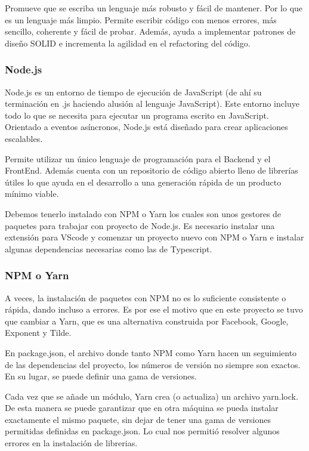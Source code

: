 \documentclass[12pt,twoside,titlepage]{report}
\begin{document}
Promueve que se escriba un lenguaje más robusto y fácil de mantener. Por lo que es un lenguaje más limpio. Permite escribir código con menos errores, más sencillo, coherente y fácil de probar. Además, ayuda a implementar patrones de diseño SOLID e incrementa la agilidad en el refactoring del código.

\subsubsection{Node.js}

Node.js es un entorno de tiempo de ejecución de JavaScript (de ahí su terminación en .js haciendo alusión al lenguaje JavaScript). Este entorno incluye todo lo que se necesita para ejecutar un programa escrito en JavaScript. Orientado a eventos asíncronos, Node.js está diseñado para crear aplicaciones escalables.

Permite utilizar un único lenguaje de programación para el Backend y el FrontEnd. Además cuenta con un repositorio de código abierto lleno de librerías útiles lo que ayuda en el desarrollo a una generación rápida de un producto mínimo viable.

Debemos tenerlo instalado con NPM o Yarn los cuales son unos gestores de paquetes para trabajar con proyecto de Node.js. Es necesario instalar una extensión para VScode y comenzar un proyecto nuevo con NPM o Yarn e instalar algunas dependencias necesarias como las de Typescript.

\subsubsection{NPM o Yarn}

A veces, la instalación de paquetes con NPM no es lo suficiente consistente o rápida, dando incluso a errores. Es por ese el motivo que en este proyecto se tuvo que cambiar a Yarn, que es una alternativa construida por Facebook, Google, Exponent y Tilde.

En package.json, el archivo donde tanto NPM como Yarn hacen un seguimiento de las dependencias del proyecto, los números de versión no siempre son exactos. En su lugar, se puede definir una gama de versiones.

Cada vez que se añade un módulo, Yarn crea (o actualiza) un archivo yarn.lock. De esta manera se puede garantizar que en otra máquina se pueda instalar exactamente el mismo paquete, sin dejar de tener una gama de versiones permitidas definidas en package.json. Lo cual nos permitió resolver algunos errores en la instalación de librerias.
\end{document}
